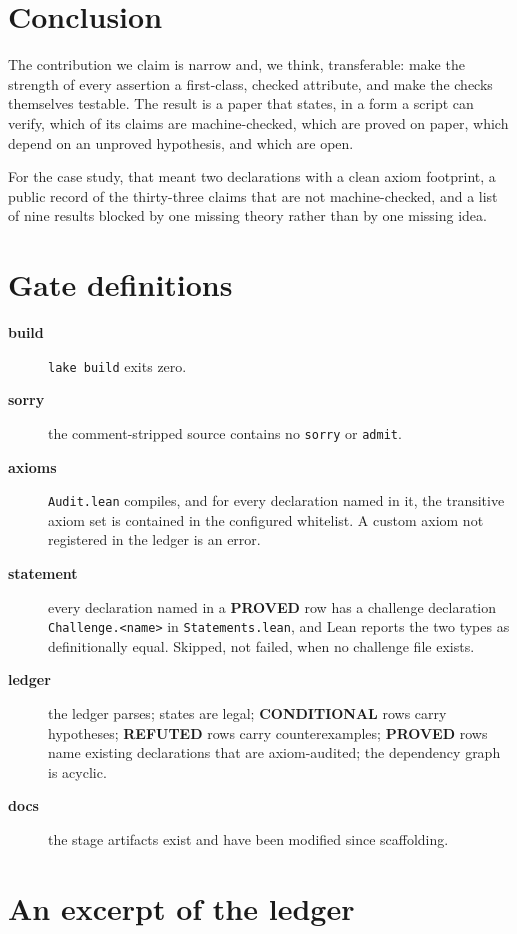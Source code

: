 \documentclass[11pt]{article}
\newcommand{\claim}[1]{\textbf{#1}}
\newcommand{\code}[1]{\texttt{#1}}
\begin{document}
\section{Conclusion}

The contribution we claim is narrow and, we think, transferable: make the
strength of every assertion a first-class, checked attribute, and make the
checks themselves testable. The result is a paper that states, in a form a
script can verify, which of its claims are machine-checked, which are proved on
paper, which depend on an unproved hypothesis, and which are open.

For the case study, that meant two declarations with a clean axiom footprint, a
public record of the thirty-three claims that are not machine-checked, and a
list of nine results blocked by one missing theory rather than by one missing
idea.

\appendix

\section{Gate definitions}

{\sloppy
\begin{description}
\item[\textbf{build}] \code{lake build} exits zero.
\item[\textbf{sorry}] the comment-stripped source contains no \code{sorry}
  or \code{admit}.
\item[\textbf{axioms}] \code{Audit.lean} compiles, and for every declaration
  named in it, the transitive axiom set is contained in the configured
  whitelist. A custom axiom not registered in the ledger is an error.
\item[\textbf{statement}] every declaration named in a \claim{PROVED} row has a
  challenge declaration \code{Challenge.<name>} in \code{Statements.lean}, and
  Lean reports the two types as definitionally equal. Skipped, not failed,
  when no challenge file exists.
\item[\textbf{ledger}] the ledger parses; states are legal; \claim{CONDITIONAL}
  rows carry hypotheses; \claim{REFUTED} rows carry counterexamples;
  \claim{PROVED} rows name existing declarations that are axiom-audited; the
  dependency graph is acyclic.
\item[\textbf{docs}] the stage artifacts exist and have been modified since
  scaffolding.
\end{description}
}

\section{An excerpt of the ledger}
\end{document}
